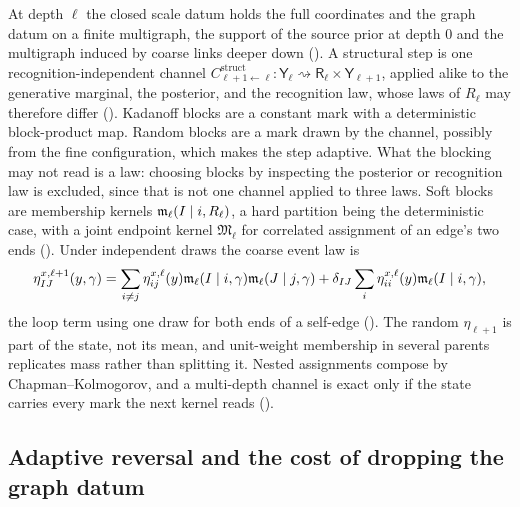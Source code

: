 At depth $\ell$ the closed scale datum holds the full coordinates and the graph datum on a finite
multigraph, the support of the source prior at depth $0$ and the multigraph induced by coarse links
deeper down (). A structural step is one recognition-independent channel
$C^{\mathrm{struct}}_{\ell+1\leftarrow\ell}:\mathsf Y_\ell\rightsquigarrow\mathsf R_\ell\times\mathsf
Y_{\ell+1}$, applied alike to the generative marginal, the posterior, and the recognition law, whose
laws of $R_\ell$ may therefore differ (). Kadanoff blocks are a
constant mark with a deterministic block-product map. Random blocks are a mark drawn by the channel,
possibly from the fine configuration, which makes the step adaptive. What the blocking may not read is a
law: choosing blocks by inspecting the posterior or recognition law is excluded, since that is not one
channel applied to three laws. Soft blocks are membership kernels $\mathfrak m_\ell(I\mid i,R_\ell)$, a
hard partition being the deterministic case, with a joint endpoint kernel $\mathfrak M_\ell$ for
correlated assignment of an edge's two ends (). Under independent
draws the coarse event law is
\[
\eta^{x,\ell+1}_{IJ}(y,\gamma)
=\sum_{i\ne j}\eta^{x,\ell}_{ij}(y)\mathfrak m_\ell(I\mid i,\gamma)\mathfrak m_\ell(J\mid j,\gamma)
+\delta_{IJ}\sum_i\eta^{x,\ell}_{ii}(y)\mathfrak m_\ell(I\mid i,\gamma),
\]
the loop term using one draw for both ends of a self-edge (). The
random $\eta_{\ell+1}$ is part of the state, not its mean, and unit-weight membership in several parents
replicates mass rather than splitting it. Nested assignments compose by Chapman--Kolmogorov, and a
multi-depth channel is exact only if the state carries every mark the next kernel reads
().

\subsection{Adaptive reversal and the cost of dropping the graph datum}

